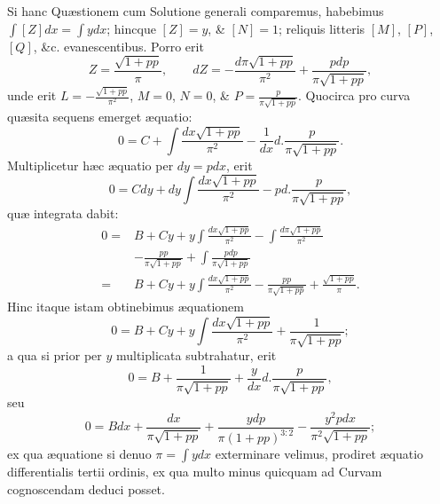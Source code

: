 Si hanc Quæstionem cum Solutione generali comparemus, habebimus $\int[Z]dx=\int ydx$; hincque $[Z]=y$, \& $[N]=1$; reliquis litteris $[M]$, $[P]$, $[Q]$, \&c. evanescentibus. Porro erit
\[Z=\frac{\sqrt{1+pp}}\pi,\qquad dZ=-\frac{d\pi\sqrt{1+pp}}{\pi^2}+\frac{pdp}{\pi\sqrt{1+pp}},\]
unde erit $L=-\frac{\sqrt{1+pp}}{\pi^2}$, $M=0$, $N=0$, \& $P=\frac p{\pi\sqrt{1+pp}}$. Quocirca pro curva quæsita sequens emerget æquatio:
\[0=C+\int\frac{dx\sqrt{1+pp}}{\pi^2}-\frac1{dx}d.\frac p{\pi\sqrt{1+pp}}.\]
Multiplicetur hæc æquatio per $dy=pdx$, erit
\[0=Cdy+dy\int\frac{dx\sqrt{1+pp}}{\pi^2}-pd.\frac p{\pi\sqrt{1+pp}},\]
quæ integrata dabit:
\[
\begin{aligned}
0={}&B+Cy+y\int\frac{dx\sqrt{1+pp}}{\pi^2}-\int\frac{d\pi\sqrt{1+pp}}{\pi^2}\\
&-\frac{pp}{\pi\sqrt{1+pp}}+\int\frac{pdp}{\pi\sqrt{1+pp}}\\
={}&B+Cy+y\int\frac{dx\sqrt{1+pp}}{\pi^2}-\frac{pp}{\pi\sqrt{1+pp}}+\frac{\sqrt{1+pp}}\pi.
\end{aligned}
\]
Hinc itaque istam obtinebimus æquationem
\[0=B+Cy+y\int\frac{dx\sqrt{1+pp}}{\pi^2}+\frac1{\pi\sqrt{1+pp}};\]
a qua si prior per $y$ multiplicata subtrahatur, erit
\[0=B+\frac1{\pi\sqrt{1+pp}}+\frac y{dx}d.\frac p{\pi\sqrt{1+pp}},\]
seu
\[0=Bdx+\frac{dx}{\pi\sqrt{1+pp}}+\frac{ydp}{\pi(1+pp)^{3:2}}-\frac{y^2pdx}{\pi^2\sqrt{1+pp}};\]
ex qua æquatione si denuo $\pi=\int ydx$ exterminare velimus, prodiret æquatio differentialis tertii ordinis, ex qua multo minus quicquam ad Curvam cognoscendam deduci posset.

